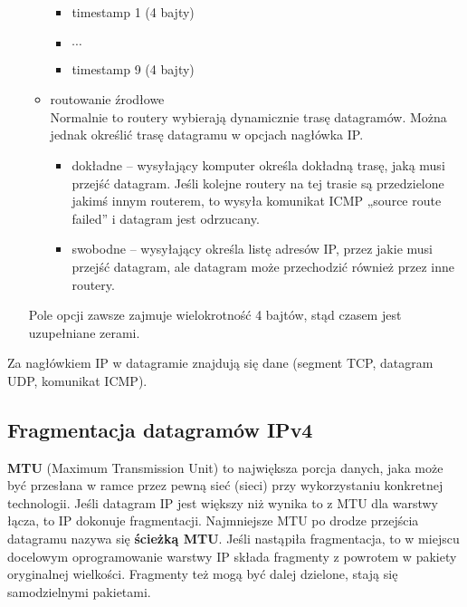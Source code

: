 \documentclass[../main.tex]{subfiles}
\begin{document}
\begin{itemize}
\begin{itemize}
\begin{itemize}
                \item timestamp 1 (4 bajty)
                \item $\cdots$
                \item timestamp 9 (4 bajty)
            \end{itemize}
            \item routowanie źrodłowe\\
            Normalnie to routery wybierają dynamicznie trasę datagramów. Można jednak określić trasę datagramu w opcjach nagłówka IP.
            \begin{itemize}
                \item  dokładne – wysyłający komputer określa dokładną trasę, jaką musi przejść datagram. Jeśli kolejne routery na tej trasie są przedzielone jakimś innym routerem, to wysyła komunikat ICMP „source route failed” i datagram jest odrzucany.
                \item swobodne – wysyłający określa listę adresów IP, przez jakie musi przejść datagram, ale datagram może przechodzić również przez inne routery.
            \end{itemize}
        \end{itemize}
        Pole opcji zawsze zajmuje wielokrotność 4 bajtów, stąd czasem jest uzupełniane zerami.
    \end{itemize}
    Za nagłówkiem IP w datagramie znajdują się dane (segment TCP, datagram UDP, komunikat ICMP).

    \subsection{Fragmentacja datagramów IPv4}
    \textbf{MTU} (Maximum Transmission Unit) to największa porcja danych, jaka może być przesłana w ramce przez pewną sieć (sieci) przy wykorzystaniu konkretnej technologii. Jeśli datagram IP jest większy niż wynika to z MTU dla warstwy łącza, to IP dokonuje fragmentacji. Najmniejsze MTU po drodze przejścia datagramu nazywa się \textbf{ścieżką MTU}. Jeśli nastąpiła fragmentacja, to w miejscu docelowym oprogramowanie warstwy IP składa fragmenty z powrotem w pakiety oryginalnej wielkości.
    Fragmenty też mogą być dalej dzielone, stają się samodzielnymi pakietami.\\
\end{document}

